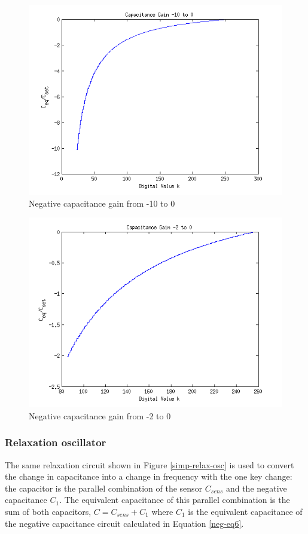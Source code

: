 \begin{figure}
	\begin{center}
		\includegraphics[width=.6\textwidth]{Images/neg-cap-gain-1.png}
		\caption{Negative capacitance gain from -10 to 0\label{neg-fig1}}
	\end{center}
\end{figure}

\begin{figure}
	\begin{center}
		\includegraphics[width=.6\textwidth]{Images/neg-cap-gain-2.png}
		\caption{Negative capacitance gain from -2 to 0\label{neg-fig2}}
	\end{center}
\end{figure}

\subsubsection{Relaxation oscillator}
The same relaxation circuit shown in Figure \ref{simp-relax-osc} is used to convert the change in capacitance into a change in frequency with the one key change: the capacitor is the parallel combination of the sensor $C_{sens}$ and the negative capacitance $C_{1}$.  The equivalent capacitance of this parallel combination is the sum of both capacitors, $C=C_{sens}+C_1$ where $C_1$ is the equivalent capacitance of the negative capacitance circuit calculated in Equation \ref{neg-eq6}. 

